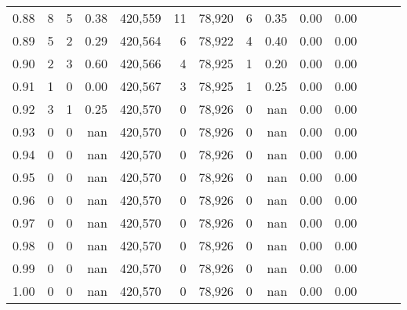 \begin{tabular}{rrrrrrrrrrrrrr}
0.88 &       8 &      5 &  0.38 &  420,559 &       11 &  78,920 &       6 &  0.35 &  0.00 &      0.00 \\
0.89 &       5 &      2 &  0.29 &  420,564 &        6 &  78,922 &       4 &  0.40 &  0.00 &      0.00 \\
0.90 &       2 &      3 &  0.60 &  420,566 &        4 &  78,925 &       1 &  0.20 &  0.00 &      0.00 \\
0.91 &       1 &      0 &  0.00 &  420,567 &        3 &  78,925 &       1 &  0.25 &  0.00 &      0.00 \\
0.92 &       3 &      1 &  0.25 &  420,570 &        0 &  78,926 &       0 &   nan &  0.00 &      0.00 \\
0.93 &       0 &      0 &   nan &  420,570 &        0 &  78,926 &       0 &   nan &  0.00 &      0.00 \\
0.94 &       0 &      0 &   nan &  420,570 &        0 &  78,926 &       0 &   nan &  0.00 &      0.00 \\
0.95 &       0 &      0 &   nan &  420,570 &        0 &  78,926 &       0 &   nan &  0.00 &      0.00 \\
0.96 &       0 &      0 &   nan &  420,570 &        0 &  78,926 &       0 &   nan &  0.00 &      0.00 \\
0.97 &       0 &      0 &   nan &  420,570 &        0 &  78,926 &       0 &   nan &  0.00 &      0.00 \\
0.98 &       0 &      0 &   nan &  420,570 &        0 &  78,926 &       0 &   nan &  0.00 &      0.00 \\
0.99 &       0 &      0 &   nan &  420,570 &        0 &  78,926 &       0 &   nan &  0.00 &      0.00 \\
1.00 &       0 &      0 &   nan &  420,570 &        0 &  78,926 &       0 &   nan &  0.00 &      0.00 \\
\bottomrule
\end{tabular}
